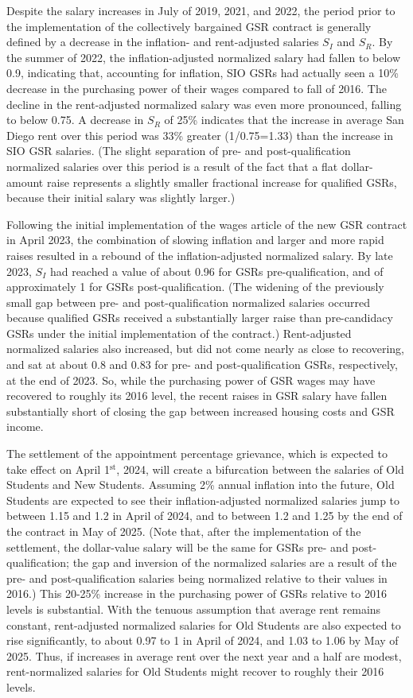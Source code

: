 \documentclass{article}
\begin{document}
Despite the salary increases in July of 2019, 2021, and 2022, the period prior to the implementation of the collectively bargained GSR contract is generally defined by a decrease in the inflation- and rent-adjusted salaries $S_I$ and $S_R$. By the summer of 2022, the inflation-adjusted normalized salary had fallen to below 0.9, indicating that, accounting for inflation, SIO GSRs had actually seen a 10\% decrease in the purchasing power of their wages compared to fall of 2016. The decline in the rent-adjusted normalized salary was even more pronounced, falling to below 0.75. A decrease in $S_R$ of 25\% indicates that the increase in average San Diego rent over this period was 33\% greater (1/0.75=1.33) than the increase in SIO GSR salaries. (The slight separation of pre- and post-qualification normalized salaries over this period is a result of the fact that a flat dollar-amount raise represents a slightly smaller fractional increase for qualified GSRs, because their initial salary was slightly larger.)

Following the initial implementation of the wages article of the new GSR contract in April 2023, the combination of slowing inflation and larger and more rapid raises resulted in a rebound of the inflation-adjusted normalized salary. By late 2023, $S_I$ had reached a value of about 0.96 for GSRs pre-qualification, and of approximately 1 for GSRs post-qualification. (The widening of the previously small gap between pre- and post-qualification normalized salaries occurred because qualified GSRs received a substantially larger raise than pre-candidacy GSRs under the initial implementation of the contract.) Rent-adjusted normalized salaries also increased, but did not come nearly as close to recovering, and sat at about 0.8 and 0.83 for pre- and post-qualification GSRs, respectively, at the end of 2023. So, while the purchasing power of GSR wages may have recovered to roughly its 2016 level, the recent raises in GSR salary have fallen substantially short of closing the gap between increased housing costs and GSR income.

The settlement of the appointment percentage grievance, which is expected to take effect on April 1$^\text{st}$, 2024, will create a bifurcation between the salaries of Old Students and New Students. Assuming 2\% annual inflation into the future, Old Students are expected to see their inflation-adjusted normalized salaries jump to between 1.15 and 1.2 in April of 2024, and to between 1.2 and 1.25 by the end of the contract in May of 2025. (Note that, after the implementation of the settlement, the dollar-value salary will be the same for GSRs pre- and post-qualification; the gap and inversion of the normalized salaries are a result of the pre- and post-qualification salaries being normalized relative to their values in 2016.) This 20-25\% increase in the purchasing power of GSRs relative to 2016 levels is substantial. With the tenuous assumption that average rent remains constant, rent-adjusted normalized salaries for Old Students are also expected to rise significantly, to about 0.97 to 1 in April of 2024, and 1.03 to 1.06 by May of 2025. Thus, if increases in average rent over the next year and a half are modest, rent-normalized salaries for Old Students might recover to roughly their 2016 levels.
\end{document}
